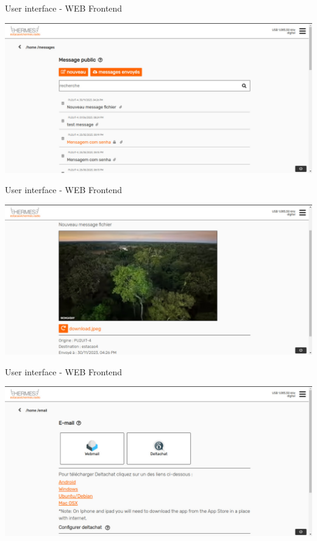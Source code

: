 \documentclass[aspectratio=169,xcolor={x11names,svgnames,dvipsnames}]{beamer}
\begin{document}
\begin{frame}{User interface - WEB Frontend}

  \vspace{-0.15cm}
  \begin{center}
    \includegraphics[width=.9\columnwidth]{hermes-ui5.jpg}
  \end{center}


\end{frame}


\begin{frame}{User interface - WEB Frontend}

  \vspace{-0.15cm}
  \begin{center}
    \includegraphics[width=.9\columnwidth]{hermes-ui4.jpg}
  \end{center}

\end{frame}


\begin{frame}{User interface - WEB Frontend}

  \vspace{-0.15cm}
  \begin{center}
    \includegraphics[width=.9\columnwidth]{hermes-ui6.jpg}
  \end{center}

\end{frame}
\end{document}
